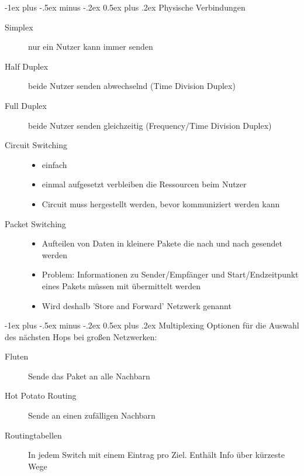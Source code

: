 \documentclass[10pt,landscape]{article}
\makeatletter
\renewcommand{\section}{\@startsection{section}{1}{0mm}%
                                {-1ex plus -.5ex minus -.2ex}%
                                {0.5ex plus .2ex}%
                                {\normalfont\large\bfseries}}
\makeatother
\begin{document}
\raggedright
\footnotesize
\begin{multicols}{3}


\setlength{\premulticols}{1pt}
\setlength{\postmulticols}{1pt}
\setlength{\multicolsep}{1pt}
\setlength{\columnsep}{2pt}

\section{Physische Verbindungen}
\begin{description}
    \item[Simplex] nur ein Nutzer kann immer senden
    \item[Half Duplex] beide Nutzer senden abwechselnd (Time Division Duplex)
    \item[Full Duplex] beide Nutzer senden gleichzeitig (Frequency/Time Division Duplex)
\end{description}

\begin{description}
    \item[Circuit Switching]
    \begin{itemize}
        \item einfach
        \item einmal aufgesetzt verbleiben die Ressourcen beim Nutzer
        \item Circuit muss hergestellt werden, bevor kommuniziert werden kann
    \end{itemize}
    \item[Packet Switching]
    \begin{itemize}
        \item Aufteilen von Daten in kleinere Pakete die nach und nach gesendet werden
        \item Problem: Informationen zu Sender/Empfänger und Start/Endzeitpunkt eines Pakets müssen mit übermittelt werden
        \item Wird deshalb 'Store and Forward' Netzwerk genannt
    \end{itemize}
\end{description}

\section{Multiplexing}
Optionen für die Auswahl des nächsten Hops bei großen Netzwerken:
\begin{description}
    \item[Fluten] Sende das Paket an alle Nachbarn
    \item[Hot Potato Routing] Sende an einen zufälligen Nachbarn
    \item[Routingtabellen] In jedem Switch mit einem Eintrag pro Ziel. Enthält Info über kürzeste Wege
\end{description}


\end{multicols}
\end{document}
